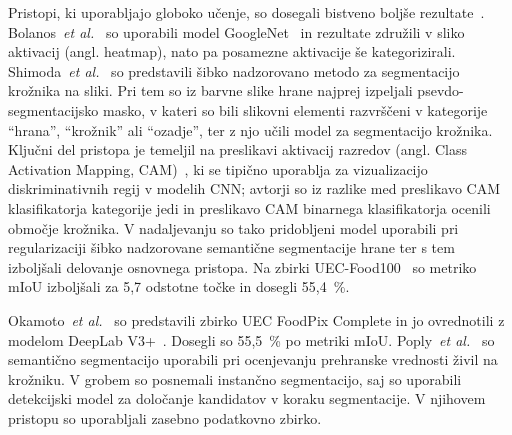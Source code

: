 \documentclass[a4paper,twoside,openright,12pt,slovene]{book}
\newcommand{\etal}{\textit{et al.}} %
\begin{document}
            Pristopi, ki uporabljajo globoko učenje, so dosegali bistveno
            boljše rezultate~\cite{src:minaee2021image}.
            Bolanos~\etal~\cite{src:bolanos2016simultaneous} so uporabili model
            GoogleNet~\cite{src:szegedy2015going-googlenet} in rezultate
            združili v sliko aktivacij (angl. heatmap), nato pa posamezne
            aktivacije še kategorizirali.
            Shimoda~\etal~\cite{src:shimoda2020weakly} so predstavili šibko
            nadzorovano metodo za segmentacijo krožnika na sliki. Pri tem so iz
            barvne slike hrane najprej izpeljali psevdo-segmentacijsko masko, v
            kateri so bili slikovni elementi razvrščeni v kategorije
            \enquote{hrana}, \enquote{krožnik} ali \enquote{ozadje}, ter z njo
            učili model za segmentacijo krožnika. Ključni del pristopa je
            temeljil na preslikavi aktivacij razredov (angl. Class Activation
            Mapping, CAM)~\cite{src:zhou2016learning-cam}, ki se tipično
            uporablja za vizualizacijo diskriminativnih regij v modelih CNN;
            avtorji so iz razlike med preslikavo CAM klasifikatorja kategorije jedi in preslikavo CAM
            binarnega klasifikatorja ocenili območje krožnika. V nadaljevanju
            so tako pridobljeni model uporabili pri regularizaciji šibko
            nadzorovane semantične segmentacije hrane ter s tem izboljšali
            delovanje osnovnega pristopa. Na zbirki
            UEC-Food100~\cite{src:matsuda2012recognition} so metriko mIoU
            izboljšali za 5{,}7 odstotne točke in dosegli 55{,}4~\%.


            Okamoto~\etal~\cite{src:okamoto2021uec} so predstavili zbirko UEC
            FoodPix Complete in jo ovrednotili z modelom DeepLab
            V3+~\cite{src:chen2017deeplab}. Dosegli so 55{,}5~\% po metriki
            mIoU.
            Poply~\etal~\cite{src:poply2021refined} so semantično segmentacijo
            uporabili pri ocenjevanju prehranske vrednosti živil na krožniku. V
            grobem so posnemali instančno segmentacijo, saj so uporabili
            detekcijski model za določanje kandidatov v koraku segmentacije. V
            njihovem pristopu so uporabljali zasebno podatkovno zbirko.
\end{document}

